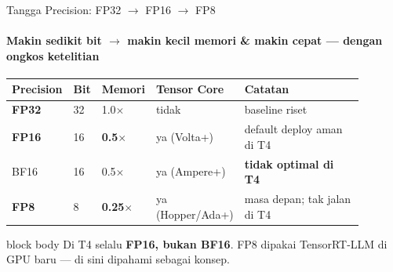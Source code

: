 \documentclass[aspectratio=169,t]{beamer}
\newcommand{\takeaway}[1]{%
  \vspace{0.3em}
  \begin{beamercolorbox}[rounded=true,shadow=false,sep=6pt]{block body}
    \centering\small\color{nvlightgreen}#1
  \end{beamercolorbox}%
}
\begin{document}
\begin{frame}{Tangga Precision: FP32 $\to$ FP16 $\to$ FP8}
  \framesubtitle{Makin sedikit bit $\to$ makin kecil memori \& makin cepat --- dengan ongkos ketelitian}
  \begin{center}
  \renewcommand{\arraystretch}{1.25}{\footnotesize\setlength{\tabcolsep}{5pt}
  \begin{tabular}{@{}p{0.14\linewidth}p{0.06\linewidth}p{0.13\linewidth}p{0.22\linewidth}p{0.34\linewidth}@{}}
    \toprule \rowcolor{nvcard!50}
    \textbf{Precision} & \textbf{Bit} & \textbf{Memori} & \textbf{Tensor Core} & \textbf{Catatan} \\ \midrule
    \textbf{FP32} & 32 & 1.0$\times$ & tidak & baseline riset \\
    \textbf{FP16} & 16 & \textbf{0.5$\times$} & ya (Volta+) & default deploy aman di T4 \\
    BF16 & 16 & 0.5$\times$ & ya (Ampere+) & \textbf{tidak optimal di T4} \\
    \textbf{FP8} & 8 & \textbf{0.25$\times$} & ya (Hopper/Ada+) & masa depan; tak jalan di T4 \\
    \bottomrule
  \end{tabular}}
  \end{center}
  \takeaway{Di T4 selalu \textbf{FP16, bukan BF16}. FP8 dipakai TensorRT-LLM di GPU baru --- di sini dipahami sebagai konsep.}
\end{frame}
\end{document}
